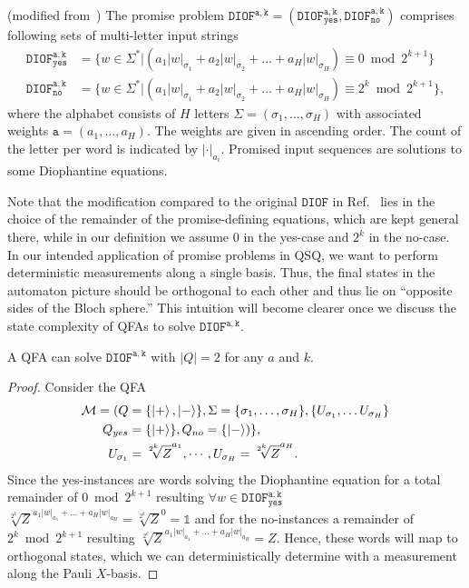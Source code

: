 \documentclass[../main.tex]{subfiles}
\begin{document}
\begin{definition}\label{def:diof} (modified from~\cite{bianchi2014complexity})
    The promise problem $\mathtt{DIOF^{a,k}}=(\mathtt{DIOF^{a,k}_{yes}},\mathtt{DIOF^{a,k}_{no}})$ comprises following sets of multi-letter input strings
    \begin{align}
       \mathtt{DIOF^{a,k}_{yes}} &= \{ w \in \Sigma^* | (a_1|w|_{\sigma_1} + a_2|w|_{\sigma_2} + \dots + a_H|w|_{\sigma_H}) \equiv 0 \bmod{2^{k+1}}\} \\
        \mathtt{DIOF^{a,k}_{no}} &= \{ w \in \Sigma^* | (a_1|w|_{\sigma_1} + a_2|w|_{\sigma_2} + \dots + a_H|w|_{\sigma_H}) \equiv 2^k \bmod{2^{k+1}}\},
    \end{align}
    where the alphabet consists of $H$ letters $\Sigma = (\sigma_1, \dots, \sigma_H)$ with  associated weights $\mathtt{a} = (a_1, \dots, a_H)$. The weights are given in ascending order.
    The count of the letter per word is indicated by $|\cdot|_{a_i}$. Promised input sequences are solutions to some Diophantine equations.
\end{definition}

Note that the modification compared to the original $\mathtt{DIOF}$ in Ref.~\cite{bianchi2014complexity} lies in the choice of the remainder of the promise-defining equations, which are kept general there, while in our definition we assume $0$ in the yes-case and $2^k$ in the no-case. In our intended application of promise problems in QSQ, we want to perform deterministic measurements along a single basis. Thus, the final states in the automaton picture should be orthogonal to each other and thus lie on ``opposite sides of the Bloch sphere.'' This intuition will become clearer once we discuss the state complexity of QFAs to solve $\mathtt{DIOF^{a,k}}$.

\begin{theorem}
    A QFA can solve $\mathtt{DIOF^{a,k}}$ with $|Q|=2$ for any $a$ and $k$.
\end{theorem}

\begin{proof}
    Consider the QFA 
    \begin{align*}
        \mathcal{M} = ( Q &= \{ \ket{+},\ket{-} \}, \Sigma = \{\sigma_1, \dots, \sigma_H \}, \{U_{\sigma_1},\dots U_{\sigma_H}\}  \\
        Q_{yes} &= \{ \ket{+} \}, Q_{no} = \{ \ket{-}) \}, \\
        U_{\sigma_1} &= \sqrt[2^k]{Z}^{a_1}, \cdots, U_{\sigma_H} = \sqrt[2^k]{Z}^{a_H} . 
    \end{align*}
    Since the yes-instances are words solving the Diophantine equation for a total remainder of $0 \bmod{2^{k+1}}$ resulting $\forall w \in \mathtt{DIOF^{a,k}_{yes}}$ $\sqrt[2^k]{Z}^{a_1|w|_{a_1}+ \dots + a_H|w|_{a_H}} = \sqrt[2^k]{Z}^{0} = \mathds{1}$ and for the no-instances a remainder of $2^k \bmod{2^{k+1}}$ resulting $\sqrt[2^k]{Z}^{a_1|w|_{a_1}+ \dots + a_H|w|_{a_H}} = Z$. Hence, these words will map to orthogonal states, which we can deterministically determine with a measurement along the Pauli $X$-basis.
\end{proof}
\end{document}
